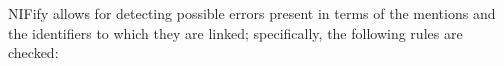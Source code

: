 \documentclass[sigconf]{acmart}
\begin{document}

NIFify allows for detecting possible errors present in terms of the mentions and the identifiers to which they are linked; specifically, the following rules are checked:

\end{document}
